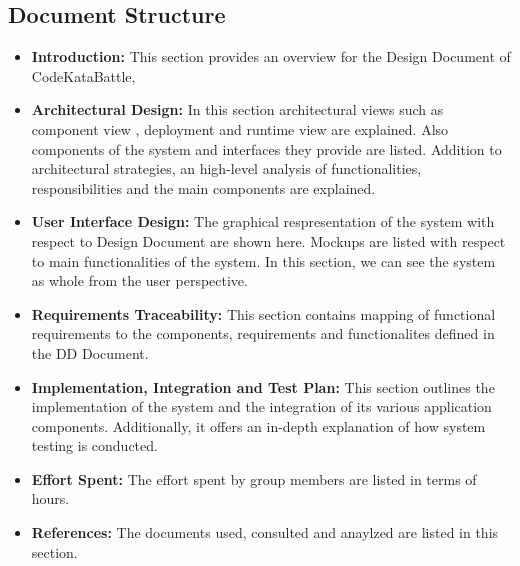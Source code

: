 \subsection{Document Structure}

\begin{itemize}
    \item \textbf{Introduction:} This section provides an overview for the Design Document of CodeKataBattle,
    \item \textbf{Architectural Design:} In this section architectural views such as component view , deployment and runtime view are explained. Also components of the system and interfaces they provide are listed. Addition to architectural strategies, an high-level analysis of functionalities, responsibilities and the main components are explained.
    \item \textbf{User Interface Design:} The graphical respresentation of the system with respect to Design Document are shown here. Mockups are listed with respect to main functionalities of the system. In this section, we can see the system as whole from the user perspective.
    \item \textbf{Requirements Traceability:} This section contains mapping of functional requirements to the components, requirements and functionalites defined in the DD Document.
    \item \textbf{Implementation, Integration and Test Plan:} This section outlines the implementation of the system and the integration of its various application components. Additionally, it offers an in-depth explanation of how system testing is conducted.
    \item \textbf{Effort Spent:} The effort spent by group members are listed in terms of hours.
    \item \textbf{References:} The documents used, consulted and anaylzed are listed in this section.
\end{itemize}
